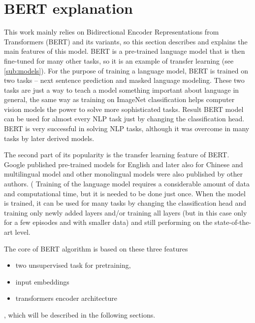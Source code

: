 \section{BERT explanation}
\label{sec:bert}
This work mainly relies on Bidirectional Encoder Representations from Transformers (BERT) \citep{Devlin2019} and its variants, so this section describes and explains the main features of this model. BERT is a pre-trained language model that is then fine-tuned for many other tasks, so it is an example of transfer learning (see \ref{sub:models}).
For the purpose of training a language model, BERT is trained on two tasks -- next sentence prediction and masked language modeling. These two tasks are just a way to teach a model something important about language in general, the same way as training on ImageNet classification helps computer vision models the power to solve more sophisticated tasks. Result BERT model can be used for almost every NLP task just by changing the classification head. BERT is very successful in solving NLP tasks, although it was overcome in many tasks by later derived models. 

The second part of its popularity is the transfer learning feature of BERT. Google %
published pre-trained models for English and later also for Chinese and multilingual model and other monolingual models were also published by other authors. ( %
Training of the language model requires a considerable amount of data 
and computational time, but it is needed to be done just once. When the model is trained, it can be used for many tasks by changing the classification head and training only newly added layers and/or training all layers (but in this case only for a few episodes and with smaller data) and still performing on the state-of-the-art level. %



The core of BERT algorithm is based on these three features
\begin{itemize}
\item two unsupervised task for pretraining,
\item input embeddings
\item transformers encoder architecture
\end{itemize}
, which will be described in the following sections.

